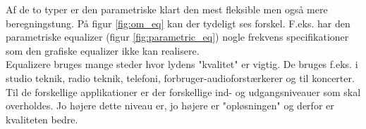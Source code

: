 Af de to typer er den parametriske klart den mest fleksible men også mere beregningstung. På figur \ref{fig:om_eq} kan der tydeligt ses forskel. F.eks. har den parametriske equalizer (figur \ref{fig:parametric_eq}) nogle frekvens specifikationer som den grafiske equalizer ikke kan realisere.\\

Equalizere bruges mange steder hvor lydens "kvalitet" er vigtig. De bruges f.eks. i studio teknik, radio teknik, telefoni, forbruger-audioforstærkerer og til koncerter. Til de forskellige applikationer er der forskellige ind- og udgangsniveauer som skal overholdes. Jo højere dette niveau er, jo højere er "opløsningen" og derfor er kvaliteten bedre. 
